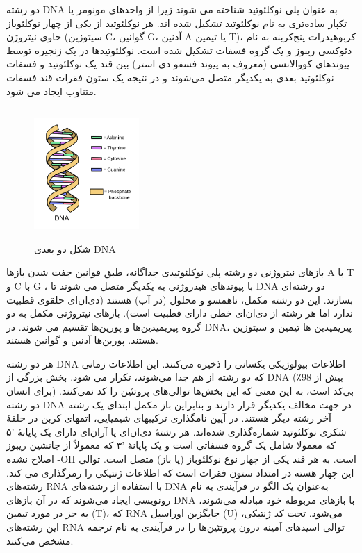 \documentclass[12pt,a4paper,BCOR=.7cm,headsepline,bibliography=totoc]{report}
\begin{document}
دو رشته DNA به عنوان پلی نوکلئوتید شناخته می شوند زیرا از واحدهای مونومر یا تکپار ساده‌تری به نام نوکلئوتید تشکیل شده اند. هر نوکلئوتید از یکی از چهار نوکلئوباز حاوی نیتروژن (سیتوزین C، گوانین G، آدنین A یا تیمین T)،  کربوهیدرات پنج‌کربنه به نام دئوکسی ریبوز و یک گروه فسفات تشکیل شده است. نوکلئوتیدها در یک زنجیره توسط پیوندهای کووالانسی (معروف به پیوند فسفو دی استر) بین قند یک نوکلئوتید و فسفات نوکلئوتید بعدی به یکدیگر متصل می‌شوند و در نتیجه یک ستون فقرات قند-فسفات متناوب ایجاد می شود.
\begin{figure}
\centering
\includegraphics[width=4cm, height=5cm]{pictures/DNApng.png}
\caption{
شکل دو بعدی DNA
}\label{wrap-fig:2}
\end{figure}
 بازهای نیتروژنی دو رشته پلی نوکلئوتیدی جداگانه، طبق قوانین جفت شدن باز‌ها 
\lr{)}A با T و C با G\lr{(}
، با پیوندهای هیدروژنی به یکدیگر متصل می شوند تا DNA دو رشته‌ای بسازند. این دو رشته مکمل، ناهمسو و محلول (در آب) هستند (دی‌ان‌ای حلقوی قطبیت ندارد اما هر رشته از دی‌ان‌ای خطی دارای قطبیت است). بازهای نیتروژنی مکمل به دو گروه پیریمیدین‌ها و پورین‌ها تقسیم می شوند. در DNA، پیریمیدین ها تیمین و سیتوزین هستند. پورین‌ها آدنین و گوانین هستند.


هر دو رشته DNA اطلاعات بیولوژیکی یکسانی را ذخیره می‌کنند. این اطلاعات زمانی که دو رشته از هم جدا می‌شوند، تکرار می شود. بخش بزرگی از DNA (بیش از 98٪ برای انسان) بی‌کد
 است، به این معنی که این بخش‌ها توالی‌های پروتئین را کد نمی‌کنند. دو رشته DNA در جهت مخالف یکدیگر قرار دارند و بنابراین باز مکمل ابتدای یک رشته آخر رشته دیگر هستند. در آیین نامگذاری ترکیبهای شیمیایی، اتمهای کربن در حلقهٔ شکری نوکلئوتید شماره‌گذاری شده‌اند. هر رشتهٔ دی‌ان‌ای یا آران‌ای دارای یک پایانهٔ '۵ که معمولا شامل یک گروه فسفاتی است و یک پایانهٔ '۳ که معمولاً از جانشین ریبوز اصلاح نشده -OH است. به هر قند یکی از چهار نوع نوکلئوباز (یا باز) متصل است. توالی این چهار هسته در امتداد ستون فقرات است که اطلاعات ژنتیکی را رمزگذاری می کند. رشته‌های RNA با استفاده از رشته‌های DNA به‌عنوان یک الگو در فرآیندی به نام رونویسی ایجاد می‌شوند که در آن بازهای DNA با بازهای مربوطه خود مبادله می‌شوند، به جز در مورد تیمین (T)، که RNA جایگزین اوراسیل (U) می‌شود. تحت کد ژنتیکی، این رشته‌های RNA توالی اسیدهای آمینه درون پروتئین‌ها را در فرآیندی به نام ترجمه مشخص می‌کنند.
\end{document}
